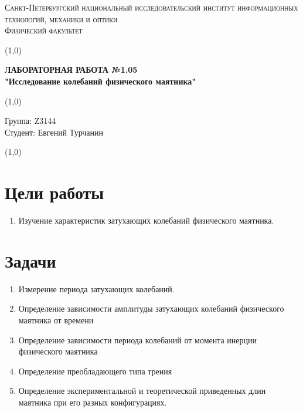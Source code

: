 \documentclass[a4paper]{article}
\begin{document}
\begin{center}
\textsc{Санкт-Петербургский национальный исследовательский институт информационных технологий, механики и оптики\\[3mm]
Физический факультет} \\[3mm]

\end{center}
\vspace{5mm}
\line(1,0){\textwidth}
\begin{center}
\textbf{ЛАБОРАТОРНАЯ РАБОТА №1.05\\}
\textbf{"Исследование колебаний физического маятника"}
\end{center}
\vspace{2mm}
\line(1,0){\textwidth}
\vspace{5mm}
\begin{minipage}{0.4\textwidth}
    Группа: Z3144 \\
    Студент: Евгений Турчанин\\
    \vspace{1mm}
\end{minipage}
\hfill
\vspace{1mm}
\line(1,0){\textwidth}

\section{\textbf{Цели работы}}


\begin{enumerate}
\item Изучение характеристик затухающих колебаний физического маятника.
\end{enumerate}

\section{\textbf{Задачи}}

\begin{enumerate}
    \item Измерение периода затухающих колебаний.
    \item Определение зависимости амплитуды затухающих колебаний физического маятника от времени
    \item Определение зависимости периода колебаний от момента инерции физического маятника
    \item Определение преобладающего типа трения
    \item Определение экспериментальной и теоретической приведенных длин маятника при его разных конфигурациях.
\end{enumerate}
\end{document}
